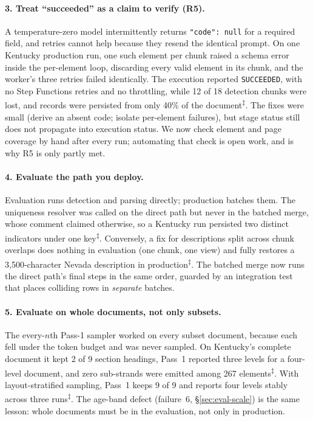 \documentclass[letterpaper]{article} %
\newcommand{\elog}{\textsuperscript{$\ddagger$}}
\begin{document}
\paragraph{3. Treat ``succeeded'' as a claim to verify (R5).} A
temperature-zero model intermittently returns \texttt{"code": null} for a
required field, and retries cannot help because they resend the identical
prompt. On one Kentucky production run, one such element per chunk raised a
schema error inside the per-element loop, discarding every valid element in
its chunk, and the worker's three retries failed identically. The execution
reported \texttt{SUCCEEDED}, with no Step Functions retries and no throttling,
while 12 of 18 detection chunks were lost, and records were persisted from
only 40\% of the document\elog. The fixes were small (derive an absent code;
isolate per-element failures), but stage status still does not propagate into
execution status. We now check element and page coverage by hand after every
run; automating that check is open work, and is why R5 is only partly met.

\paragraph{4. Evaluate the path you deploy.} Evaluation runs detection and
parsing directly; production batches them. The uniqueness resolver was called
on the direct path but never in the batched merge, whose comment claimed
otherwise, so a Kentucky run persisted two distinct indicators under one
key\elog. Conversely, a fix for descriptions split across chunk overlaps does
nothing in evaluation (one chunk, one view) and fully restores a
3{,}500-character Nevada description in production\elog. The batched merge now
runs the direct path's final steps in the same order, guarded by an
integration test that places colliding rows in \emph{separate} batches.

\paragraph{5. Evaluate on whole documents, not only subsets.} The
every-$n$th Pass-1 sampler worked on every subset document, because each fell
under the token budget and was never sampled. On Kentucky's complete document
it kept 2 of 9 section headings, Pass~1 reported three levels for a four-level
document, and zero sub-strands were emitted among 267 elements\elog. With
layout-stratified sampling, Pass~1 keeps 9 of 9 and reports four levels stably
across three runs\elog. The age-band defect (failure~6, \S\ref{sec:eval-scale})
is the same lesson: whole documents must be in the evaluation, not only in
production.
\end{document}
